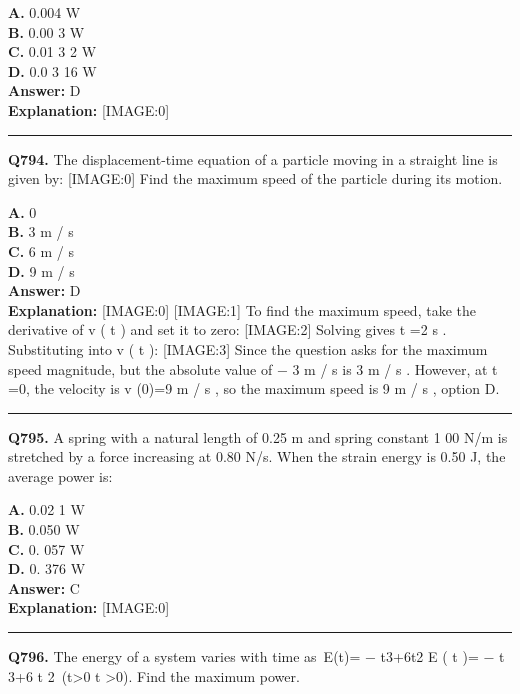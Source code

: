 \documentclass[12pt]{article}
\begin{document}
\textbf{A.} 0.004 W \\
\textbf{B.} 0.00
3
W \\
\textbf{C.} 0.01
3
2 W \\
\textbf{D.} 0.0
3
16 W \\

\textbf{Answer:} D \\
\textbf{Explanation:} [IMAGE:0]

\hrule
\vspace{1em}


\noindent
\textbf{Q794.} The displacement-time equation of a particle moving in a straight line is given by:
[IMAGE:0]
Find the maximum speed of the particle during its motion.



\textbf{A.} 0 \\
\textbf{B.} 3
m
/
s \\
\textbf{C.} 6
m
/
s \\
\textbf{D.} 9
m
/
s \\

\textbf{Answer:} D \\
\textbf{Explanation:} [IMAGE:0]
[IMAGE:1]
To find the maximum speed, take the derivative of
v
(
t
) and set it to zero:
[IMAGE:2]
Solving gives
t
=2
s
. Substituting into
v
(
t
):
[IMAGE:3]
Since the question asks for the maximum speed magnitude, but the absolute value of
−
3
m
/
s
is 3
m
/
s
. However, at
t
=0, the velocity is
v
(0)=9
m
/
s
, so the maximum speed is 9
m
/
s
, option D.

\hrule
\vspace{1em}


\noindent
\textbf{Q795.} A spring with a natural length of 0.25 m and spring constant
1
00 N/m is stretched by a force increasing at 0.80 N/s. When the strain energy is 0.50 J, the average power is:



\textbf{A.} 0.02
1
W \\
\textbf{B.} 0.050 W \\
\textbf{C.} 0.
057
W \\
\textbf{D.} 0.
376
W \\

\textbf{Answer:} C \\
\textbf{Explanation:} [IMAGE:0]

\hrule
\vspace{1em}


\noindent
\textbf{Q796.} The energy of a system varies with time as E(t)=
−
t3+6t2
E
(
t
)=
−
t
3+6
t
2 (t>0
t
>0). Find the maximum power.
\end{document}
